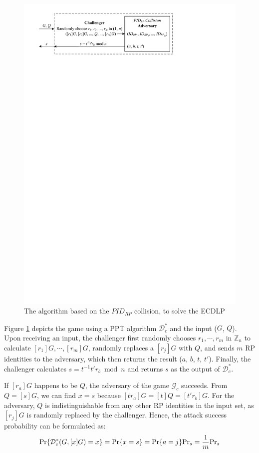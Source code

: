 \begin{figure}[tb]
  \centering
  \includegraphics[width=0.97\linewidth]{fig/ecdlp_algorithm.pdf}
  \caption{The algorithm based on the $PID_{RP}$ collision, to solve the ECDLP}
  \label{fig:ecdlp_algorithm}
\end{figure}

Figure \ref{fig:ecdlp_algorithm} depicts the game %
using a PPT algorithm $\mathcal{D}^*_c$ and the input ($G$, $Q$).
Upon receiving an input, the challenger first randomly chooses $r_1, \cdots, r_m$ in $\mathbb{Z}_n$ to calculate $[r_1]G, \cdots, [r_m]G$, randomly replaces a $[r_j]G$ with $Q$, and sends $m$ RP identities to the adversary, which then returns the result ($a$, $b$, $t$, $t'$).
Finally, the challenger calculates $s = t^{-1}t'r_b \bmod n$ and returns $s$ as the output of $\mathcal{D}^*_c$.

If $[r_a]G$ happens to be $Q$, the adversary of the game $\mathcal{G}_c$ succeeds. From $Q = [s]G$, we can find $x=s$ because $[tr_a]G = [t]Q = [t'r_b]G$. For the adversary, $Q$ is indistinguishable from any other RP identities in the input set, as $[r_j]G$ is randomly replaced by the challenger. Hence, the attack success probability can be formulated as:
\begin{equation*}
{\rm Pr}\{\mathcal{D}^*_c(G, [x]G)=x\} = {\rm Pr}\{x = s\}={\rm Pr}\{a=j\}{\rm Pr}_s=\frac{1}{m}{\rm Pr}_s
\end{equation*}

